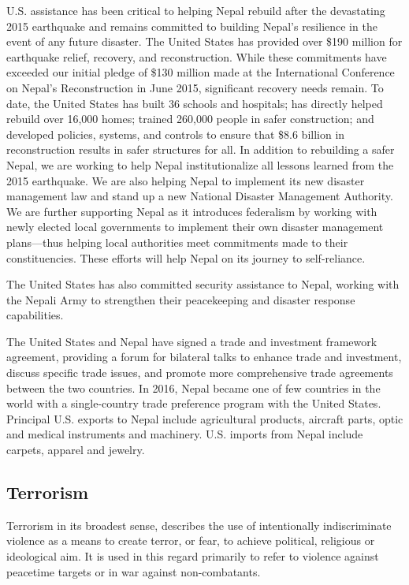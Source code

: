 \documentclass[
  openany]{book}
\begin{document}
U.S. assistance has been critical to helping Nepal rebuild after the devastating 2015 earthquake and remains committed to building Nepal's resilience in the event of any future disaster. The United States has provided over \$190 million for earthquake relief, recovery, and reconstruction. While these commitments have exceeded our initial pledge of \$130 million made at the International Conference on Nepal's Reconstruction in June 2015, significant recovery needs remain. To date, the United States has built 36 schools and hospitals; has directly helped rebuild over 16,000 homes; trained 260,000 people in safer construction; and developed policies, systems, and controls to ensure that \$8.6 billion in reconstruction results in safer structures for all. In addition to rebuilding a safer Nepal, we are working to help Nepal institutionalize all lessons learned from the 2015 earthquake. We are also helping Nepal to implement its new disaster management law and stand up a new National Disaster Management Authority. We are further supporting Nepal as it introduces federalism by working with newly elected local governments to implement their own disaster management plans---thus helping local authorities meet commitments made to their constituencies. These efforts will help Nepal on its journey to self-reliance.

The United States has also committed security assistance to Nepal, working with the Nepali Army to strengthen their peacekeeping and disaster response capabilities.

The United States and Nepal have signed a trade and investment framework agreement, providing a forum for bilateral talks to enhance trade and investment, discuss specific trade issues, and promote more comprehensive trade agreements between the two countries. In 2016, Nepal became one of few countries in the world with a single-country trade preference program with the United States. Principal U.S. exports to Nepal include agricultural products, aircraft parts, optic and medical instruments and machinery. U.S. imports from Nepal include carpets, apparel and jewelry.

\hypertarget{terrorism}{%
\subsection{Terrorism}\label{terrorism}}

Terrorism in its broadest sense, describes the use of intentionally indiscriminate violence as a means to create terror, or fear, to achieve political, religious or ideological aim. It is used in this regard primarily to refer to violence against peacetime targets or in war against non-combatants.
\end{document}
